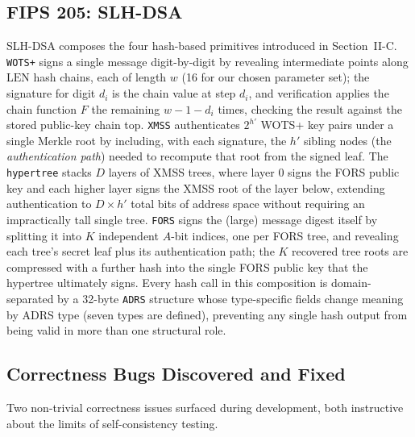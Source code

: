 \documentclass[10pt,conference]{IEEEtran}
\begin{document}
\subsection{FIPS 205: SLH-DSA}

SLH-DSA composes the four hash-based primitives introduced in
Section~II-C. \texttt{WOTS+} signs a single message digit-by-digit by
revealing intermediate points along $\mathrm{LEN}$ hash chains, each of
length $w$ (16 for our chosen parameter set); the signature for digit
$d_i$ is the chain value at step $d_i$, and verification applies the
chain function $F$ the remaining $w-1-d_i$ times, checking the result
against the stored public-key chain top. \texttt{XMSS} authenticates
$2^{h'}$ WOTS+ key pairs under a single Merkle root by including, with
each signature, the $h'$ sibling nodes (the \emph{authentication path})
needed to recompute that root from the signed leaf. The
\texttt{hypertree} stacks $D$ layers of XMSS trees, where layer $0$
signs the FORS public key and each higher layer signs the XMSS root of
the layer below, extending authentication to $D \times h'$ total bits of
address space without requiring an impractically tall single tree.
\texttt{FORS} signs the (large) message digest itself by splitting it
into $K$ independent $A$-bit indices, one per FORS tree, and revealing
each tree's secret leaf plus its authentication path; the $K$ recovered
tree roots are compressed with a further hash into the single FORS
public key that the hypertree ultimately signs. Every hash call in this
composition is domain-separated by a 32-byte \texttt{ADRS} structure
whose type-specific fields change meaning by ADRS type (seven types are
defined), preventing any single hash output from being valid in more
than one structural role.

\subsection{Correctness Bugs Discovered and Fixed}

Two non-trivial correctness issues surfaced during development, both
instructive about the limits of self-consistency testing.
\end{document}
